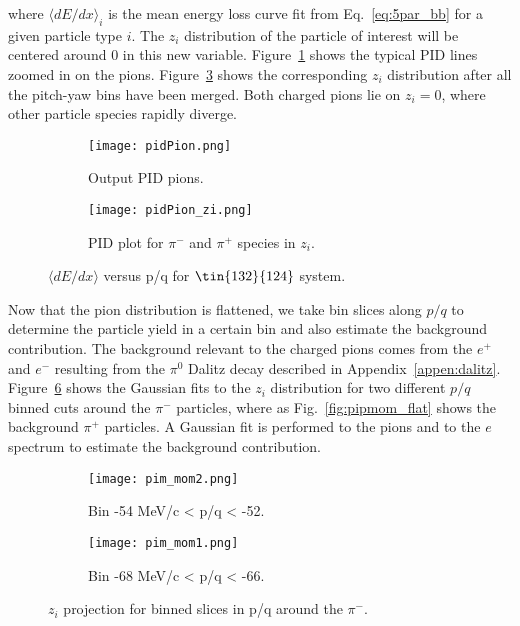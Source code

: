 where $\langle dE/dx\rangle_i$ is the mean energy loss curve fit from Eq.~\ref{eq:5par_bb} for a given particle type $i$. The $z_i$ distribution of the particle of interest will be centered around 0 in this new variable. Figure~\ref{fig:pidpion_raw} shows the typical PID lines zoomed in on the pions. Figure~\ref{fig:pidpion} shows the corresponding $z_i$ distribution after all the pitch-yaw bins have been merged. Both charged pions lie on $z_i=0$, where other particle species rapidly diverge. 

\begin{figure}[!htb]
    \centering
    \begin{subfigure}[t]{0.49\textwidth}
        \centering
        \texttt{[image: pidPion.png]}
        \caption{Output PID pions.} \label{fig:pidpion_raw}
    \end{subfigure}
    \hfill
    \begin{subfigure}[t]{.49\textwidth}
        \centering
        \texttt{[image: pidPion\_zi.png]} 
        \caption{PID plot for $\pi^-$ and $\pi^+$ species in $z_i$. } \label{fig:pipion_zi}
    \end{subfigure}
  
    \caption{$\langle dE/dx\rangle$ versus p/q for $\tin{132}{124}$ system.}
\label{fig:pidpion}
\end{figure}

Now that the pion distribution is flattened, we take bin slices along $p/q$ to determine the particle yield in a certain bin and also estimate the background contribution. The background relevant to  the charged pions comes from the $e^+$ and $e^-$ resulting from the $\pi^0$ Dalitz decay described in Appendix~\ref{appen:dalitz}. Figure~\ref{fig:pimmom_flat} shows the Gaussian fits to the $z_i$ distribution for two different $p/q$ binned cuts around the $\pi^-$ particles, where as Fig.~\ref{fig:pipmom_flat} shows the background $\pi^+$ particles. A Gaussian fit is performed to the pions and to the $e$ spectrum to estimate the background contribution. 


\begin{figure}[!htb]
    \centering
    \begin{subfigure}[t]{0.49\textwidth}
        \centering
        \texttt{[image: pim\_mom2.png]}
        \caption{Bin -54 MeV/c < p/q < -52. } \label{fig:pimmom2}
    \end{subfigure}
    \hfill
    \begin{subfigure}[t]{.49\textwidth}
        \centering
        \texttt{[image: pim\_mom1.png]} 
        \caption{Bin -68 MeV/c < p/q < -66.} \label{fig:pimmom1}
    \end{subfigure}
  
    \caption{$z_i$ projection for binned slices in p/q around the $\pi^-$.}
\label{fig:pimmom_flat}
\end{figure}



